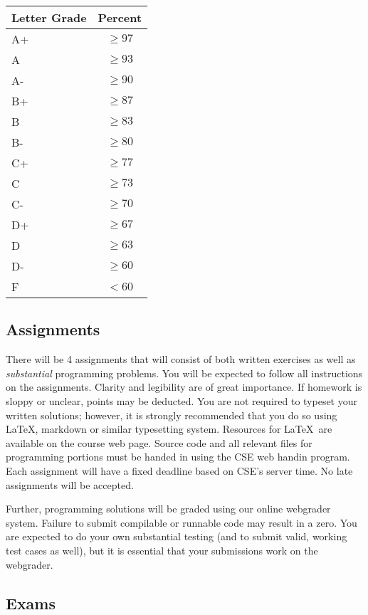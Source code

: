 \documentclass[12pt]{scrartcl}
\begin{document}
\begin{table}[h]
\centering
\begin{tabular}{p{1cm}c}
Letter Grade & Percent \\
\hline\hline
A+ & $\geq 97$ \\
A  & $\geq 93$ \\
A- & $\geq 90$ \\
B+ & $\geq 87$ \\
B  & $\geq 83$ \\
B- & $\geq 80$ \\
C+ & $\geq 77$ \\
C  & $\geq 73$ \\
C- & $\geq 70$ \\
D+ & $\geq 67$ \\
D  & $\geq 63$ \\
D- & $\geq 60$ \\
F  & $<60$ \\
\end{tabular}
\end{table}

\subsection{Assignments}

There will be 4 assignments that will consist of both written 
exercises as well as \emph{substantial} programming problems.
You will be expected to follow all instructions on the 
assignments. Clarity and legibility are of great importance. 
If homework is sloppy or unclear, points may be deducted. You 
are not required to typeset your written solutions; however, 
it is strongly recommended that you do so using \LaTeX, 
markdown or similar typesetting system. Resources for \LaTeX\ 
are available on the course web page. Source code and all 
relevant files for programming portions must be handed in 
using the CSE web handin program.  Each assignment will 
have a fixed deadline based on CSE's server time.  No late
assignments will be accepted. 

Further, programming solutions will be graded using our online
webgrader system.  Failure to submit compilable or runnable 
code may result in a zero.  You are expected to do your own
substantial testing (and to submit valid, working test cases
as well), but it is essential that your submissions work on
the webgrader.

\subsection{Exams}
\end{document}
